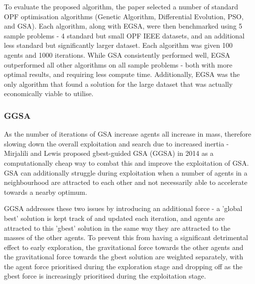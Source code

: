 To evaluate the proposed algorithm, the paper selected a number of standard OPF optimisation algorithms (Genetic Algorithm, Differential Evolution, PSO, and GSA).
Each algorithm, along with EGSA, were then benchmarked using 5 sample problems - 4 standard but small OPF IEEE datasets, and an additional less standard but significantly larger dataset.
Each algorithm was given 100 agents and 1000 iterations.
While GSA consistently performed well, EGSA outperformed all other algorithms on all sample problems - both with more optimal results, and requiring less compute time.
Additionally, EGSA was the only algorithm that found a solution for the large dataset that was actually economically viable to utilise.



\subsubsection{GGSA}\label{sec:alg:gsa:ggsa}
As the number of iterations of GSA increase agents all increase in mass, therefore slowing down the overall exploitation and search due to increased inertia - Mirjalili and Lewis \cite{GGSA} proposed gbest-guided GSA (GGSA) in 2014 as a computationally cheap way to combat this and improve the exploitation of GSA.
GSA can additionally struggle during exploitation when a number of agents in a neighbourhood are attracted to each other and not necessarily able to accelerate towards a nearby optimum.


GGSA addresses these two issues by introducing an additional force - a 'global best' solution is kept track of and updated each iteration, and agents are attracted to this 'gbest' solution in the same way they are attracted to the masses of the other agents.
To prevent this from having a significant detrimental effect to early exploration, the gravitational force towards the other agents and the gravitational force towards the gbest solution are weighted separately, with the agent force prioritised during the exploration stage and dropping off as the gbest force is increasingly prioritised during the exploitation stage.


